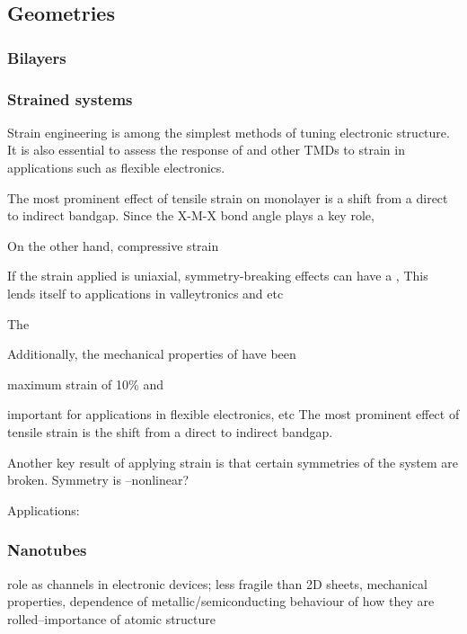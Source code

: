 \documentclass[11pt,a4paper,twoside]{report}  %
\numberwithin{equation}{section}					%
\numberwithin{figure}{section}						%
\newcommand{\red}[1]{{\color{red}#1}}
\begin{document}
\subsection{Geometries}

\subsubsection{Bilayers}



\subsubsection{Strained systems}

Strain engineering is among the simplest methods of tuning electronic structure\autocite{safiStrainTunableElectronic2022}. It is also essential to assess the response of  and other TMDs to strain in applications such as flexible electronics.

The most prominent effect of tensile strain on monolayer  is a shift from a direct to indirect bandgap. Since the X-M-X bond angle plays a key role, 

On the other hand, compressive strain 

If the strain applied is uniaxial, symmetry-breaking effects can have a , This lends itself to applications in valleytronics and etc


The 

Additionally, the mechanical properties of  have been 

maximum strain of 10\% and 

important for applications in flexible electronics, etc
The most prominent effect of tensile strain is the shift from a direct to indirect bandgap. 

Another key result of applying strain is that certain symmetries of the system are broken. Symmetry is --nonlinear?

Applications: 



\subsubsection{Nanotubes}

\red{role as channels in electronic devices; less fragile than 2D sheets, mechanical properties, dependence of metallic/semiconducting behaviour of how they are rolled--importance of atomic structure}
\end{document}
